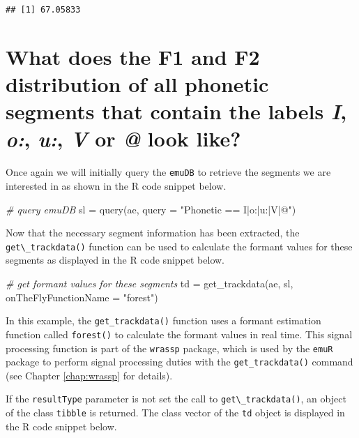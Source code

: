 \documentclass[
]{book}
\newenvironment{Shaded}{\begin{snugshade}}{\end{snugshade}}
\newcommand{\AttributeTok}[1]{\textcolor[rgb]{0.77,0.63,0.00}{#1}}
\newcommand{\CommentTok}[1]{\textcolor[rgb]{0.56,0.35,0.01}{\textit{#1}}}
\newcommand{\FunctionTok}[1]{\textcolor[rgb]{0.00,0.00,0.00}{#1}}
\newcommand{\NormalTok}[1]{#1}
\newcommand{\OtherTok}[1]{\textcolor[rgb]{0.56,0.35,0.01}{#1}}
\newcommand{\StringTok}[1]{\textcolor[rgb]{0.31,0.60,0.02}{#1}}
\begin{document}
\begin{verbatim}
## [1] 67.05833
\end{verbatim}

\hypertarget{sec:app-chap-useCases-q2}{%
\section{\texorpdfstring{What does the F1 and F2 distribution of all phonetic segments that contain the labels \emph{I}, \emph{o:}, \emph{u:}, \emph{V} or \emph{@} look like?}{What does the F1 and F2 distribution of all phonetic segments that contain the labels I, o:, u:, V or @ look like?}}\label{sec:app-chap-useCases-q2}}

Once again we will initially query the \texttt{emuDB} to retrieve the segments we are interested in as shown in the R code snippet below.

\begin{Shaded}
\begin{Highlighting}[]
\CommentTok{\# query emuDB}
\NormalTok{sl }\OtherTok{=} \FunctionTok{query}\NormalTok{(ae, }\AttributeTok{query =} \StringTok{"Phonetic == I|o:|u:|V|@"}\NormalTok{)}
\end{Highlighting}
\end{Shaded}

Now that the necessary segment information has been extracted, the \texttt{get\textbackslash{}\_trackdata()} function can be used to calculate the formant values for these segments as displayed in the R code snippet below.

\begin{Shaded}
\begin{Highlighting}[]
\CommentTok{\# get formant values for these segments}
\NormalTok{td }\OtherTok{=} \FunctionTok{get\_trackdata}\NormalTok{(ae, }
\NormalTok{                   sl,}
                   \AttributeTok{onTheFlyFunctionName =} \StringTok{"forest"}\NormalTok{)}
\end{Highlighting}
\end{Shaded}

In this example, the \texttt{get\_trackdata()} function uses a formant estimation function called \texttt{forest()} to calculate the formant values in real time. This signal processing function is part of the \texttt{wrassp} package, which is used by the \texttt{emuR} package to perform signal processing duties with the \texttt{get\_trackdata()} command (see Chapter \ref{chap:wrassp} for details).

If the \texttt{resultType} parameter is not set the call to \texttt{get\textbackslash{}\_trackdata()}, an object of the class \texttt{tibble} is returned. The class vector of the \texttt{td} object is displayed in the R code snippet below.
\end{document}
